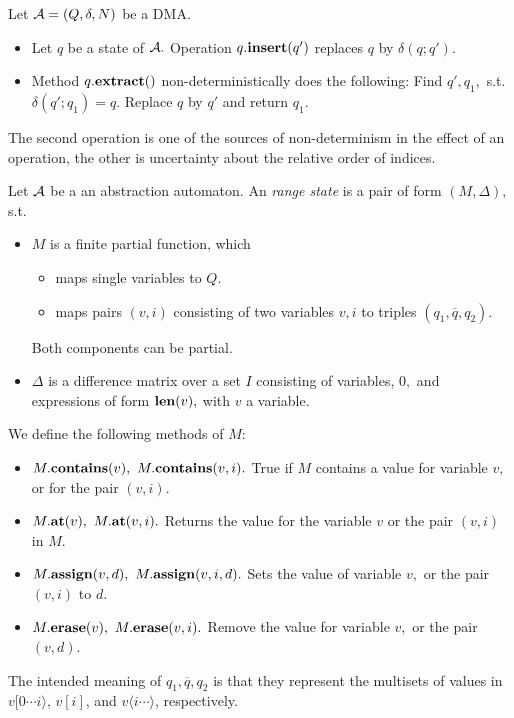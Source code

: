 \begin{definition}
        \label{Def_operations_on_DMA_states}
   Let $ {\cal A} = ( Q, \delta, N ) $ be a DMA.
   \begin{itemize}
   \item
      Let $ q $ be a state of $ {\cal A}. $
      Operation $ q. {\bf insert}(q') $ replaces
      $ q $ by $ \delta( q;q' ). $
   \item
      Method $ q. {\bf extract}( ) $ non-deterministically
      does the following:
      Find $ q', q_1, $ s.t. $ \delta(q';q_1) = q. $
      Replace $ q $ by $ q' $ and return $ q_1. $
   \end{itemize}
\end{definition}
The second operation is one of the sources of non-determinism
in the effect of an operation, the other is uncertainty about the
relative order of indices.
\begin{definition}
   \label{Def_range_state}
   Let $ {\cal A} $
   be a an abstraction automaton.
   An \emph{range state} is a pair of form $ ( M, \Delta ), $
   s.t.
   \begin{itemize}
   \item
      $ M $ is a finite partial function, which
      \begin{itemize}
      \item
         maps single variables to $ Q. $
      \item
         maps pairs $ (v,i) $ consisting of two variables $ v,i $ to
         triples $ ( q_{1}, \overline{q}, q_{2} ). $
      \end{itemize}
      Both components can be partial.
   \item
      $ \Delta $ is a difference matrix over a set
      $ I $ consisting of variables, $ 0, $
      and expressions of form $ {\bf len}(v), $
      with $ v $ a variable.
   \end{itemize}
   We define the following methods of $ M: $
   \begin{itemize}
   \item
      $ M. {\bf contains}(v), \ M. {\bf contains}(v,i). $
      True if $ M $ contains a value for variable $ v, $
      or for the pair $ (v,i). $
   \item
      $ M. {\bf at}(v), \ M. {\bf at}(v,i). $ Returns the value
      for the variable $ v $ or the pair $ (v,i) $ in $ M. $ 
   \item
      $ M. {\bf assign}(v,d), \ M. {\bf assign}(v,i,d). $ Sets the value
      of variable $ v, $ or the pair $ (v,i) $ to $ d. $
   \item
      $ M. {\bf erase}(v), \ M. {\bf erase}(v,i). $ Remove the
      value for variable $ v, $ or the pair $ (v,d). $
   \end{itemize}
\end{definition}
The intended meaning of $ q_{1}, \overline{q}, q_{2} $
is that they represent the multisets of values
in $ v[ 0 \cdots i \rangle $, $ v[i] $, and $ v \langle i \cdots \rangle $, respectively.

